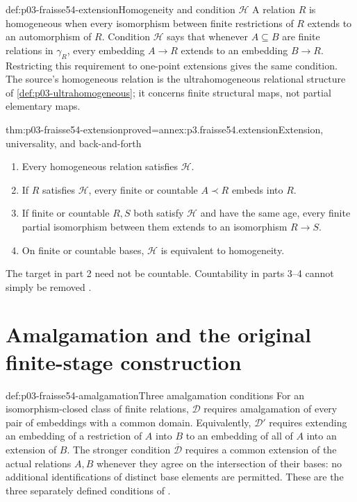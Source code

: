 \begin{hbdefinition}{def:p03-fraisse54-extension}{Homogeneity and condition \(\mathcal H\)}
A relation \(R\) is homogeneous when every isomorphism between finite
restrictions of \(R\) extends to an automorphism of \(R\).
Condition \(\mathcal H\) says that whenever \(A\subseteq B\) are finite
relations in \(\gamma_R\), every embedding \(A\to R\) extends to an
embedding \(B\to R\). Restricting this requirement to one-point extensions
gives the same condition.
The source's homogeneous relation is the ultrahomogeneous relational
structure of \cref{def:p03-ultrahomogeneous}; it concerns finite structural
maps, not partial elementary maps.
\end{hbdefinition}

\begin{hbtheorem}{thm:p03-fraisse54-extension}{proved=annex:p3.fraisse54.extension}{Extension, universality, and back-and-forth}
\begin{enumerate}
\item Every homogeneous relation satisfies \(\mathcal H\).
\item If \(R\) satisfies \(\mathcal H\), every finite or countable
      \(A\prec R\) embeds into \(R\).
\item If finite or countable \(R,S\) both satisfy \(\mathcal H\) and
      have the same age, every finite partial isomorphism between them
      extends to an isomorphism \(R\to S\).
\item On finite or countable bases, \(\mathcal H\) is equivalent to
      homogeneity.
\end{enumerate}
The target in part 2 need not be countable. Countability in parts 3--4
cannot simply be removed \cite[\S5]{Fraisse1954}.
\end{hbtheorem}

\section{Amalgamation and the original finite-stage construction}
\label{sec:p03-fraisse54-amalgamation}

\begin{hbdefinition}{def:p03-fraisse54-amalgamation}{Three amalgamation conditions}
For an isomorphism-closed class of finite relations, \(\mathcal D\)
requires amalgamation of every pair of embeddings with a common domain.
Equivalently, \(\mathcal D'\) requires extending an embedding of a
restriction of \(A\) into \(B\) to an embedding of all of \(A\) into
an extension of \(B\). The stronger condition
\(\overline{\mathcal D}\) requires a common extension of the actual
relations \(A,B\) whenever they agree on the intersection of their bases:
no additional identifications of distinct base elements are permitted.
These are the three separately defined conditions of
\cite[\S7.1]{Fraisse1954}.
\end{hbdefinition}

